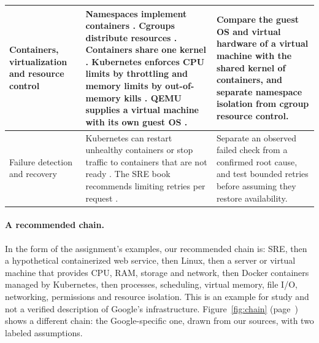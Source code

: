 \begin{longtable}{@{}>{\raggedright\arraybackslash}p{}>{\raggedright\arraybackslash}p{}>{\raggedright\arraybackslash}p{}@{}}
\hline
Containers, virtualization and resource control & Namespaces implement containers \cite{man7}. Cgroups distribute resources \cite{kernel-docs}. Containers share one kernel \cite{docs-docker-get-started-docker-concepts-the-basics-what-is-a-container}. Kubernetes enforces CPU limits by throttling and memory limits by out-of-memory kills \cite{kubernetes-docs}. QEMU supplies a virtual machine with its own guest OS \cite{qemu-docs-master-system-introduction-html}. & Compare the guest OS and virtual hardware of a virtual machine with the shared kernel of containers, and separate namespace isolation from cgroup resource control. \\
\hline
Failure detection and recovery & Kubernetes can restart unhealthy containers or stop traffic to containers that are not ready \cite{kubernetes-docs}. The SRE book recommends limiting retries per request \cite{sre-book}. & Separate an observed failed check from a confirmed root cause, and test bounded retries before assuming they restore availability. \\
\hline
\end{longtable}

\paragraph{A recommended chain.}
In the form of the assignment's examples, our recommended chain is: SRE, then a hypothetical containerized web service, then Linux, then a server or virtual machine that provides CPU, RAM, storage and network, then Docker containers managed by Kubernetes, then processes, scheduling, virtual memory, file I/O, networking, permissions and resource isolation. This is an example for study and not a verified description of Google's infrastructure. Figure~\ref{fig:chain} (page~\pageref{fig:chain}) shows a different chain: the Google-specific one, drawn from our sources, with two labeled assumptions.
